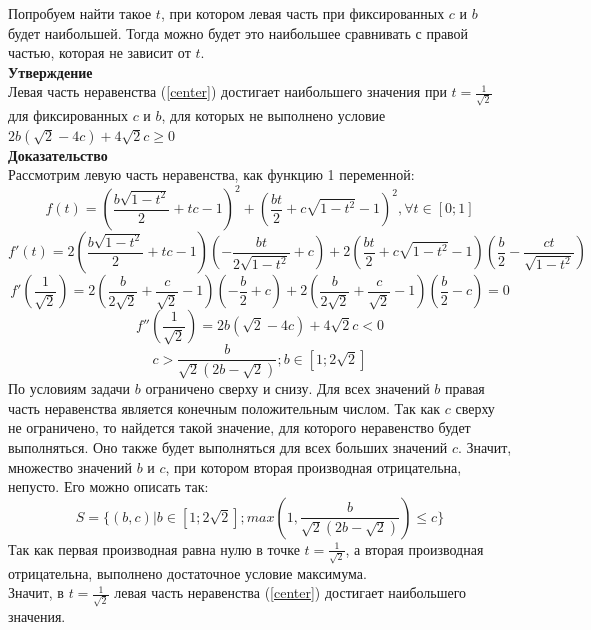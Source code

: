 Попробуем найти такое $t$, при котором левая часть при фиксированных $c$ и $b$ будет наибольшей. Тогда можно будет это наибольшее сравнивать с правой частью, которая не зависит от $t$. \\
\textbf{Утверждение}\\
Левая часть неравенства (\ref{center}) достигает наибольшего значения при $t=\frac{1}{\sqrt{2}}$ для фиксированных $c$ и $b$, для которых не выполнено условие $2 b (\sqrt{2} - 4 c) + 4 \sqrt{2} c \geq 0$\\
\textbf{Доказательство}\\
Рассмотрим левую часть неравенства, как функцию 1 переменной:
\begin{equation}
f(t)=( \frac{b\sqrt{1-t^2}}{2}+tc - 1)^2 + (\frac{bt}{2}+c\sqrt{1-t^2}-1)^2, \forall t \in [0;1]
\end{equation}
\begin{equation}
f'(t)=2( \frac{b\sqrt{1-t^2}}{2}+tc - 1)(-\frac{bt}{2\sqrt{1-t^2}}+c)+2(\frac{bt}{2}+c\sqrt{1-t^2}-1)(\frac{b}{2}-\frac{ct}{\sqrt{1-t^2}})
\end{equation}
\begin{equation}
f'(\frac{1}{\sqrt{2}})=2( \frac{b}{2\sqrt{2}}+\frac{c}{\sqrt{2}} - 1)(-\frac{b}{2}+c)+2(\frac{b}{2\sqrt{2}}+\frac{c}{\sqrt{2}}-1)(\frac{b}{2}-c)=0
\end{equation}
\begin{equation}
f''(\frac{1}{\sqrt{2}})=2 b (\sqrt{2} - 4 c) + 4 \sqrt{2} c < 0
\end{equation}
\begin{equation}
c>\frac{b}{\sqrt{2}(2b-\sqrt{2})}; b\in[1;2\sqrt{2}]
\end{equation}
По условиям задачи $b$ ограничено сверху и снизу. Для всех значений $b$ правая часть неравенства является конечным положительным числом. Так как $c$ сверху не ограничено, то найдется такой значение, для которого неравенство будет выполняться. Оно также будет выполняться для всех больших значений $c$. Значит, множество значений $b$ и $c$, при котором вторая производная отрицательна, непусто. Его можно описать так:
\begin{equation}
S=\{(b,c) | b \in [1;2\sqrt{2}]; max(1,\frac{b}{\sqrt{2}(2b-\sqrt{2})}) \leq c \}
\end{equation}
Так как первая производная равна нулю в точке $t=\frac{1}{\sqrt{2}}$, а вторая производная отрицательна, выполнено достаточное условие максимума. \\
Значит, в $t=\frac{1}{\sqrt{2}}$ левая часть неравенства (\ref{center}) достигает наибольшего значения. \\

